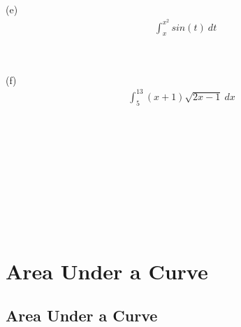 \begin{exercise}
    (e)
    \begin{align}
         & \int_x^{x^2} sin(t) \ dt \\
        \\
        \\
        \\
        \\
        \\
    \end{align}

    (f)
    \begin{align}
        \int_5^{13} (x + 1)\sqrt{2x - 1} \ dx \\
        \\
        \\
        \\
        \\
        \\
        \\
        \\
        \\
        \\
        \\
        \\
        \\
        \\
        \\
        \\
        \\
        \\
        \\
        \\
        \\
        \\
        \\
        \\
        \\
        \\
        \\
        \\
        \\
    \end{align}
\end{exercise}

\chapter{Area Under a Curve}

\section{Area Under a Curve}


